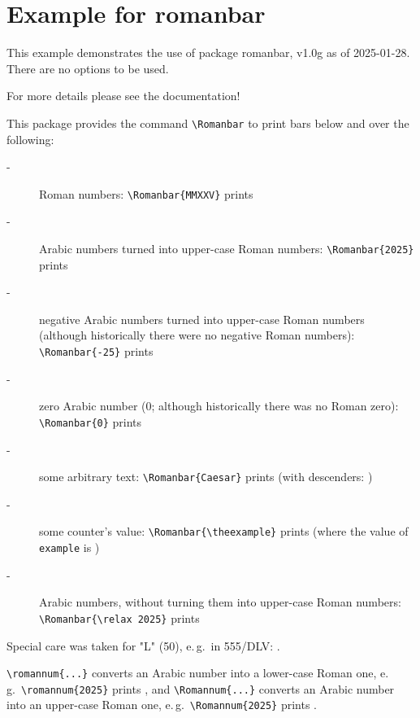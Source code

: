 \documentclass[british]{article}[2024/06/29]%
\begin{document}
\section*{Example for romanbar}

This example demonstrates the use of package\newline
\textsf{romanbar}, v1.0g as of 2025-01-28.\newline
There are no options to be used.\newline

\noindent For more details please see the documentation!

\noindent This package provides the command \verb|\Romanbar|
to print bars below and over the following:

\begin{description}
\item[-] Roman numbers: \verb|\Romanbar{MMXXV}| prints 

\item[-] Arabic numbers turned into upper-case Roman numbers:\newline
           \verb|\Romanbar{2025}| prints 

\item[-] negative Arabic numbers turned into upper-case Roman numbers
           \newline
           (although historically there were no negative Roman numbers):
           \newline
           \verb|\Romanbar{-25}| prints 

\item[-] zero Arabic number ($0$; although historically
           there was no Roman zero):\newline
           \verb|\Romanbar{0}| prints 

\item[-] some arbitrary text:
           \verb|\Romanbar{Caesar}| prints \newline
           (with descenders: )

\setcounter{example}{25}

\item[-] some counter's value:
           \verb|\Romanbar{\theexample}| prints \Romanbar{\theexample}
           \newline
           (where the value of \texttt{example} is \theexample)

\item[-] Arabic numbers, without turning them into upper-case Roman
           numbers:\newline
           \verb|\Romanbar{\relax 2025}| prints 
\end{description}

Special care was taken for "L" (50), e.\,g.~in 555/DLV: .

\verb|\romannum{...}| converts an Arabic number into a lower-case Roman one,
e.\,g.~\verb|\romannum{2025}| prints , and
\verb|\Romannum{...}| converts an Arabic number into an upper-case Roman one,
e.\,g.~\verb|\Romannum{2025}| prints .
\end{document}

